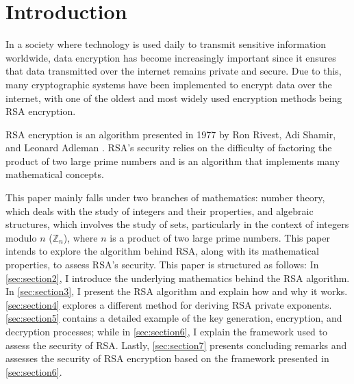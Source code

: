 \section{Introduction}
\label{sec:section1}
In a society where technology is used daily to transmit sensitive information worldwide, data encryption has become increasingly important since it ensures that data transmitted over the internet remains private and secure. Due to this, many cryptographic systems have been implemented to encrypt data over the internet, with one of the oldest and most widely used encryption methods being RSA encryption.

RSA encryption is an algorithm presented in 1977 by Ron Rivest, Adi Shamir, and Leonard Adleman \citep{Rivest_Shamir_Adleman_1977}. RSA’s security relies on the difficulty of factoring the product of two large prime numbers and is an algorithm that implements many mathematical concepts.

This paper mainly falls under two branches of mathematics: number theory, which deals with the study of integers and their properties, and algebraic structures, which involves the study of sets, particularly in the context of integers modulo $n$ ($\mathbb{Z}_n$), where $n$ is a product of two large prime numbers. This paper intends to explore the algorithm behind RSA, along with its mathematical properties, to assess RSA’s security. This paper is structured as follows: In \autoref{sec:section2}, I introduce the underlying mathematics behind the RSA algorithm. In \autoref{sec:section3}, I present the RSA algorithm and explain how and why it works. \autoref{sec:section4} explores a different method for deriving RSA private exponents. \autoref{sec:section5} contains a detailed example of the key generation, encryption, and decryption processes; while in \autoref{sec:section6}, I explain the framework used to assess the security of RSA. Lastly, \autoref{sec:section7} presents concluding remarks and assesses the security of RSA encryption based on the framework presented in \autoref{sec:section6}.





